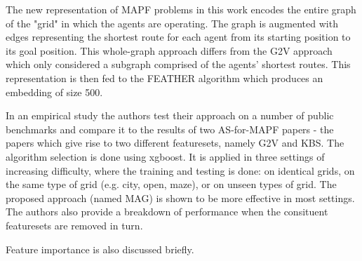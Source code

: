 The new representation of MAPF problems in this work encodes the entire graph of the "grid" in which the agents are operating. The graph is augmented with edges representing the shortest route for each agent from its starting position to its goal position. This whole-graph approach differs from the G2V approach which only considered a subgraph comprised of the agents' shortest routes. This representation is then fed to the FEATHER algorithm which produces an embedding of size 500.

In an empirical study the authors test their approach on a number of public benchmarks and compare it to the results of two AS-for-MAPF papers - the papers which give rise to two different featuresets, namely G2V and KBS. The algorithm selection is done using xgboost. It is applied in three settings of increasing difficulty, where the training and testing is done: on identical grids, on the same type of grid (e.g. city, open, maze), or on unseen types of grid. The proposed approach (named MAG) is shown to be more effective in most settings. The authors also provide a breakdown of performance when the consituent featuresets are removed in turn.

Feature importance is also discussed briefly.


